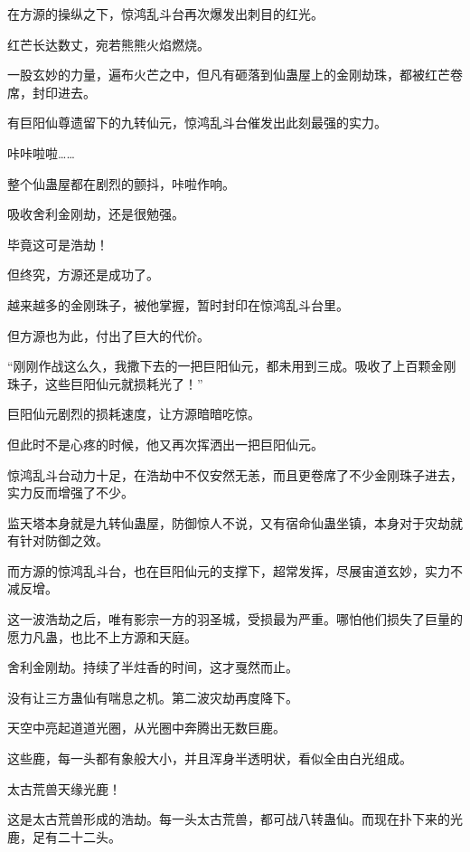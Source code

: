 
\begin{this_body}



在方源的操纵之下，惊鸿乱斗台再次爆发出刺目的红光。

红芒长达数丈，宛若熊熊火焰燃烧。

一股玄妙的力量，遍布火芒之中，但凡有砸落到仙蛊屋上的金刚劫珠，都被红芒卷席，封印进去。

有巨阳仙尊遗留下的九转仙元，惊鸿乱斗台催发出此刻最强的实力。

咔咔啦啦……

整个仙蛊屋都在剧烈的颤抖，咔啦作响。

吸收舍利金刚劫，还是很勉强。

毕竟这可是浩劫！

但终究，方源还是成功了。

越来越多的金刚珠子，被他掌握，暂时封印在惊鸿乱斗台里。

但方源也为此，付出了巨大的代价。

“刚刚作战这么久，我撒下去的一把巨阳仙元，都未用到三成。吸收了上百颗金刚珠子，这些巨阳仙元就损耗光了！”

巨阳仙元剧烈的损耗速度，让方源暗暗吃惊。

但此时不是心疼的时候，他又再次挥洒出一把巨阳仙元。

惊鸿乱斗台动力十足，在浩劫中不仅安然无恙，而且更卷席了不少金刚珠子进去，实力反而增强了不少。

监天塔本身就是九转仙蛊屋，防御惊人不说，又有宿命仙蛊坐镇，本身对于灾劫就有针对防御之效。

而方源的惊鸿乱斗台，也在巨阳仙元的支撑下，超常发挥，尽展宙道玄妙，实力不减反增。

这一波浩劫之后，唯有影宗一方的羽圣城，受损最为严重。哪怕他们损失了巨量的愿力凡蛊，也比不上方源和天庭。

舍利金刚劫。持续了半炷香的时间，这才戛然而止。

没有让三方蛊仙有喘息之机。第二波灾劫再度降下。

天空中亮起道道光圈，从光圈中奔腾出无数巨鹿。

这些鹿，每一头都有象般大小，并且浑身半透明状，看似全由白光组成。

太古荒兽天缘光鹿！

这是太古荒兽形成的浩劫。每一头太古荒兽，都可战八转蛊仙。而现在扑下来的光鹿，足有二十二头。


\end{this_body}
